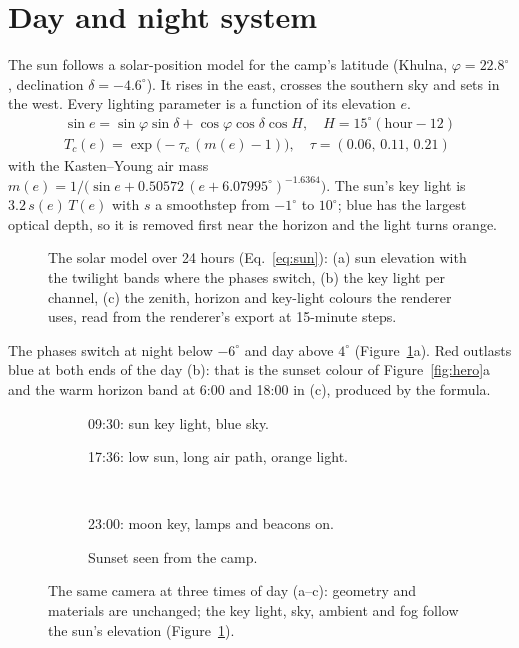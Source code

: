 \section{Day and night system}
\label{sec:day}
The sun follows a solar-position model for the camp's latitude (Khulna, $\varphi=22.8^\circ$,
declination $\delta=-4.6^\circ$). It rises in the east, crosses the southern sky and sets in the west. Every lighting
parameter is a function of its elevation $e$.
\begin{gather}
\sin e=\sin\varphi\sin\delta+\cos\varphi\cos\delta\cos H,\quad H=15^\circ(\text{hour}-12)\label{eq:sun}\\
T_c(e)=\exp\!\big(-\tau_c\,(m(e)-1)\big),\quad \tau=(0.06,\,0.11,\,0.21)\nonumber
\end{gather}
with the Kasten--Young air mass \cite{kasten1989} $m(e)=1/\big(\sin e+0.50572\,(e+6.07995^\circ)^{-1.6364}\big)$. The sun's key light is
$3.2\,s(e)\,T(e)$ with $s$ a smoothstep from $-1^\circ$ to $10^\circ$; blue has the largest optical depth, so it is
removed first near the horizon and the light turns orange.

\begin{figure}[htbp]
\centering{}
\caption{The solar model over 24 hours (Eq.~\eqref{eq:sun}): (a) sun elevation with the twilight bands where the
phases switch, (b) the key light per channel, (c) the zenith, horizon and key-light colours the renderer uses, read from
the renderer's export at 15-minute steps.}
\label{fig:daycycle}
\end{figure}

The phases switch at night below $-6^\circ$ and day above $4^\circ$ (Figure~\ref{fig:daycycle}a). Red outlasts blue at
both ends of the day (b): that is the sunset colour of Figure~\ref{fig:hero}a and the warm horizon band at 6:00 and 18:00 in (c), produced by the formula.

\begin{figure}[htbp]
\centering
\begin{subfigure}[t]{0.49\linewidth}\caption{09:30: sun key light, blue sky.}\end{subfigure}\hfill
\begin{subfigure}[t]{0.49\linewidth}\caption{17:36: low sun, long air path, orange light.}\end{subfigure}\\[1.2mm]
\begin{subfigure}[t]{0.49\linewidth}\caption{23:00: moon key, lamps and beacons on.}\end{subfigure}\hfill
\begin{subfigure}[t]{0.49\linewidth}\caption{Sunset seen from the camp.}\end{subfigure}
\caption{The same camera at three times of day (a--c): geometry and materials are unchanged; the key light, sky,
ambient and fog follow the sun's elevation (Figure~\ref{fig:daycycle}).}
\label{fig:phases}
\end{figure}

